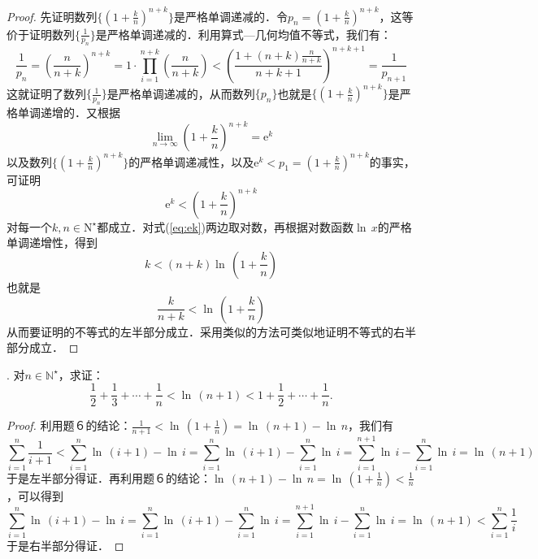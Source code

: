 \documentclass{ctexart}
\theoremstyle{definition}
\theoremstyle{definition}
\theoremstyle{plain}
\theoremstyle{plain}
\theoremstyle{plain}
\theoremstyle{definition}
\begin{document}
\begin{proof}
先证明数列$\displaystyle \{ \left(1+\frac{k}{n}\right)^{n+k}\}$是严格单调递减的．令$\displaystyle p_n =  \left(1+\frac{k}{n}\right)^{n+k}$，这等价于证明数列$\displaystyle \{ \frac{1}{p_n} \}$是严格单调递减的．利用算式---几何均值不等式，我们有：
\begin{equation}
    \frac{1}{p_n} =  \left(\frac{n}{n+k}\right)^{n+k} = 1 \cdot \prod_{i=1}^{n+k} \left(\frac{n}{n+k}\right) <(\frac{1+(n+k) \frac{n}{n+k}}{n+k+1})^{n+k+1} = \frac{1}{p_{n+1}}
\end{equation}
这就证明了数列$\displaystyle \{ \frac{1}{p_n}\}$是严格单调递减的，从而数列$\{p_n \}$也就是$\{ \displaystyle \left(1+\frac{k}{n}\right)^{n+k}\}$是严格单调递增的．又根据
\begin{equation}
    \lim_{n \to \infty} \left(1+\frac{k}{n}\right)^{n+k} = \mathrm{e}^k
\end{equation}
以及数列$\{ \displaystyle \left( 1 + \frac{k}{n} \right)^{n+k}\}$的严格单调递减性，以及$\mathrm{e}^k < p_1 = \displaystyle \left(1+\frac{k}{n}\right)^{n+k}$的事实，可证明
\begin{equation}
    \mathrm{e}^k < \left( 1 + \frac{k}{n}\right)^{n+k}
    \label{eq:ek}
\end{equation}
对每一个$k, n\in \mathrm{N}^{\star}$都成立．对式(\ref{eq:ek})两边取对数，再根据对数函数$\ln \, x$的严格单调递增性，得到
\begin{equation}
    k < (n+k) \ln \, \left(1+\frac{k}{n}\right)
\end{equation}
也就是
\begin{equation}
    \frac{k}{n+k} < \ln \, \left(1+\frac{k}{n}\right)
\end{equation}
从而要证明的不等式的左半部分成立．采用类似的方法可类似地证明不等式的右半部分成立．
\end{proof}
. 对$n \in \mathbb{N}^\star$，求证：
\begin{equation}
    \frac{1}{2} + \frac{1}{3} + \cdots + \frac{1}{n} < \ln \, \left( n+1 \right) < 1 + \frac{1}{2} + \cdots + \frac{1}{n}.
\end{equation}
\begin{proof}
利用题６的结论：$\displaystyle \frac{1}{n+1} < \ln \, \left( 1 + \frac{1}{n} \right) = \ln \, (n+1) - \ln \, n$，我们有
\begin{equation}
\sum_{i = 1}^{n} \frac{1}{i + 1} < \sum_{i=1}^n \ln \, \left( i+1 \right) - \ln \, i = \sum_{i=1}^n \ln \, \left( i + 1\right) - \sum_{i=1}^n \ln \, i = \sum_{i=1}^{n+1} \ln \, i - \sum_{i=1}^{n} \ln \, i = \ln \, \left( n+1 \right)
\end{equation}
于是左半部分得证．再利用题６的结论：$\displaystyle \ln \, \left( n+1 \right) - \ln \, n = \ln \, \left( 1 + \frac{1}{n} \right) < \frac{1}{n}$，可以得到
\begin{equation}
\sum_{i=1}^n \ln \, \left( i+1 \right) - \ln \, i = \sum_{i=1}^n \ln \, \left( i+1 \right) - \sum_{i=1}^n \ln \, i = \sum_{i=1}^{n+1} \ln \, i - \sum_{i=1}^n \ln \, i = \ln \, \left(n+1 \right) < \sum_{i=1}^n \frac{1}{i}
\end{equation}
于是右半部分得证．
\end{proof}
\end{document}
